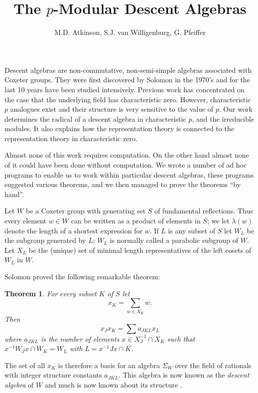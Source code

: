 \documentclass[10pt]{article}
\newtheorem{theorem}{Theorem}
\begin{document}
\date{}

\title{The  $p$-Modular Descent Algebras}
\author{M.D. Atkinson, S.J. van Willigenburg, G. Pfeiffer }
\maketitle

Descent algebras are non-commutative, non-semi-simple algebras
associated with Coxeter groups.  They were first discovered by Solomon
in the 1970's and for the last 10 years have been studied
intensively.  Previous work has concentrated on the case that the
underlying field has characteristic zero.  However, characteristic $p$
analogues exist and their structure is very
sensitive to the value of $p$.  Our work determines the radical of
a descent algebra in characteristic $p$, and the irreducible
modules.  It also explains how the representation theory is connected
to the representation theory in characteristic zero.

Almost none of this work requires computation.  On the other hand almost
none of it could have been done without computation.  We wrote a number of
ad hoc programs to enable us to work within particular descent algebras,
these programs suggested various theorems, and we then managed to prove
the theorems ``by hand''.


Let $W$ be a Coxeter group with generating set $S$ of fundamental
reflections. Thus every element $w\in W$ can be written as a product
of elements in $S$; we let $\lambda(w)$ denote the length of a
shortest expression for $w$.  If $L$ is any subset of $S$ let
$W_L$ be the subgroup generated by $L$; $W_{L}$ is normally called a
parabolic subgroup of $W$.  Let $X_L$ be the (unique) set of
minimal length representatives of the left cosets
of $W_L$ in $W$.

Solomon proved the following remarkable theorem:
\begin{theorem}\cite{solomon-mackey}
\label{so-lomon1}
For every subset $K$ of $S$ let
\[x_K=\sum_{w\in X_K}w.\]
Then
\[x_Jx_K=\sum a_{JKL}x_L\]
where $a_{JKL}$ is the number of elements $x\in X_{J}^{-1}\cap X_K$ such that
$x^{-1}W_Jx\cap W_K=W_L$ with $L=x^{-1}Jx\cap K$.
\end{theorem}

The set of all $x_K$ is therefore a basis for an algebra $\Sigma _W$ over
the field of
rationals with integer structure constants $a_{JKL}$.  This algebra
is now known as the {\em descent algebra} of $W$ and much is now
known about its structure
\cite{Atk,G&R,B&B,Ber,BBH&T,GKLL&T}.
\end{document}
